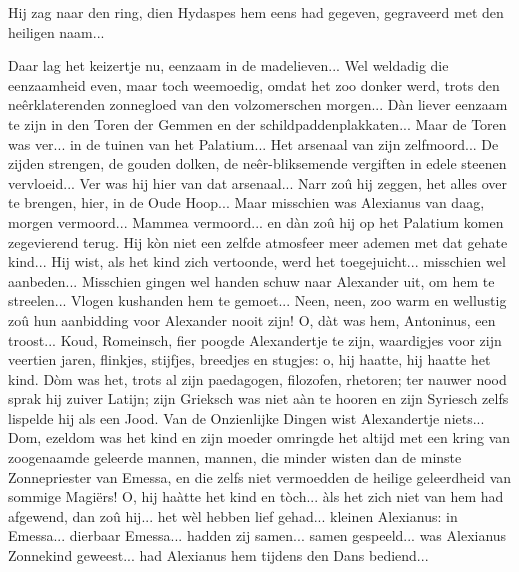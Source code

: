 \documentclass[a4paper, 12pt, oneside, dutch]{article}
\begin{document}
Hij zag naar den ring, dien Hydaspes hem eens had gegeven, gegraveerd met den heiligen naam...

Daar lag het keizertje nu, eenzaam in de madelieven... Wel weldadig die eenzaamheid even, maar toch weemoedig, omdat het zoo donker werd, trots den neêrklaterenden zonnegloed van den volzomerschen morgen... Dàn liever eenzaam te zijn in den Toren der Gemmen en der schildpaddenplakkaten... Maar de Toren was ver... in de tuinen van het Palatium... Het arsenaal van zijn zelfmoord... De zijden strengen, de gouden dolken, de neêr-bliksemende vergiften in edele steenen vervloeid... Ver was hij hier van dat arsenaal... Narr zoû hij zeggen, het alles over te brengen, hier, in de Oude Hoop... Maar misschien was Alexianus van daag, morgen vermoord... Mammea vermoord... en dàn zoû hij op het Palatium komen zegevierend terug. Hij kòn niet een zelfde atmosfeer meer ademen met dat gehate kind... Hij wist, als het kind zich vertoonde, werd het toegejuicht... misschien wel aanbeden... Misschien gingen wel handen schuw naar Alexander uit, om hem te streelen... Vlogen kushanden hem te gemoet... Neen, neen, zoo warm en wellustig zoû hun aanbidding voor Alexander nooit zijn! O, dàt was hem, Antoninus, een troost... Koud, Romeinsch, fier poogde Alexandertje te zijn, waardigjes voor zijn veertien jaren, flinkjes, stijfjes, breedjes en stugjes: o, hij haatte, hij haatte het kind. Dòm was het, trots al zijn paedagogen, filozofen, rhetoren; ter nauwer nood sprak hij zuiver Latijn; zijn Grieksch was niet aàn te hooren en zijn Syriesch zelfs lispelde hij als een Jood. Van de Onzienlijke Dingen wist Alexandertje niets... Dom, ezeldom was het kind en zijn moeder omringde het altijd met een kring van zoogenaamde geleerde mannen, mannen, die minder wisten dan de minste Zonnepriester van Emessa, en die zelfs niet vermoedden de heilige geleerdheid van sommige Magiërs! O, hij haàtte het kind en tòch... àls het zich niet van hem had afgewend, dan zoû hij... het wèl hebben lief gehad... kleinen Alexianus: in Emessa... dierbaar Emessa... hadden zij samen... samen gespeeld... was Alexianus Zonnekind geweest... had Alexianus hem tijdens den Dans bediend...
\end{document}

